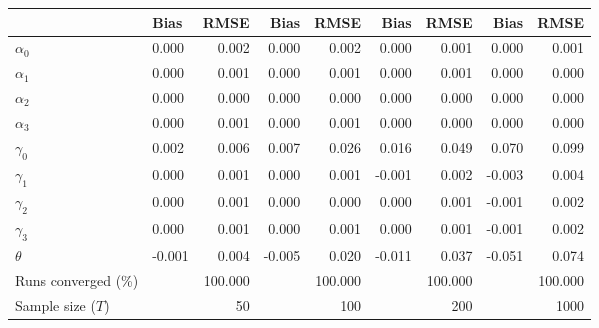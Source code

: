 
\begin{tabular}[t]{llrrrrrrr}
\toprule
  & Bias & RMSE & Bias & RMSE & Bias & RMSE & Bias & RMSE\\
\midrule
$\alpha_{0}$ & 0.000 & 0.002 & 0.000 & 0.002 & 0.000 & 0.001 & 0.000 & 0.001\\
$\alpha_{1}$ & 0.000 & 0.001 & 0.000 & 0.001 & 0.000 & 0.001 & 0.000 & 0.000\\
$\alpha_{2}$ & 0.000 & 0.000 & 0.000 & 0.000 & 0.000 & 0.000 & 0.000 & 0.000\\
$\alpha_{3}$ & 0.000 & 0.001 & 0.000 & 0.001 & 0.000 & 0.000 & 0.000 & 0.000\\
$\gamma_{0}$ & 0.002 & 0.006 & 0.007 & 0.026 & 0.016 & 0.049 & 0.070 & 0.099\\
$\gamma_{1}$ & 0.000 & 0.001 & 0.000 & 0.001 & -0.001 & 0.002 & -0.003 & 0.004\\
$\gamma_{2}$ & 0.000 & 0.001 & 0.000 & 0.000 & 0.000 & 0.001 & -0.001 & 0.002\\
$\gamma_{3}$ & 0.000 & 0.001 & 0.000 & 0.001 & 0.000 & 0.001 & -0.001 & 0.002\\
$\theta$ & -0.001 & 0.004 & -0.005 & 0.020 & -0.011 & 0.037 & -0.051 & 0.074\\
Runs converged (\%) &  & 100.000 &  & 100.000 &  & 100.000 &  & 100.000\\
Sample size ($T$) &  & 50 &  & 100 &  & 200 &  & 1000\\
\bottomrule
\end{tabular}
